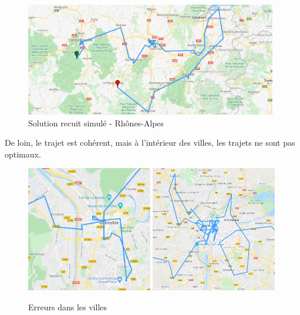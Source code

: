 \documentclass[12pt]{article}
\begin{document}
\begin{figure}[H]
\caption{Solution recuit simulé - Rhônes-Alpes}
\begin{center}
\includegraphics[width=0.98\textwidth]{ra erreur1}
\end{center}
\end{figure}

De loin, le trajet est cohérent, mais à l'intérieur des villes, les trajets ne sont pas optimaux.

\begin{figure}[H]
\caption{Erreurs dans les villes}
\begin{center}
\includegraphics[width=0.49\textwidth]{ra erreur 2}
\includegraphics[width=0.49\textwidth]{ra erreur 3}
\end{center}
\end{figure}
\end{document}
